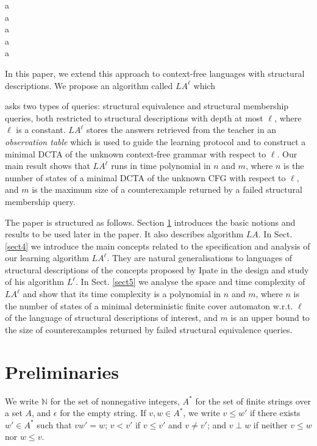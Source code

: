 \documentclass[preprint,12pt,english]{article}
\newcommand\comment[1]{}
\begin{document}
{a\\
a\\
a\\
a\\
a
}

In this paper, we extend this approach to context-free languages with structural descriptions. 
We propose an algorithm called $LA^\ell$ which 
\comment{is an adaptation of the learning algorithms $LA$ and $L^\ell$ in the following ways:
It} 
asks two types of queries: structural equivalence and structural membership queries, both restricted to structural descriptions with depth at most $\ell$, where $\ell$ is a constant.
$LA^\ell$ stores the answers retrieved from the teacher in an {\em observation table} which is used to guide the learning protocol and to construct a minimal DCTA of the unknown context-free grammar with respect to $\ell$.
Our main result shows that $LA^\ell$ runs in time  polynomial in $n$ and $m$, where $n$ is the number of states of a minimal DCTA of the unknown CFG with respect to $\ell$, and $m$ is the maximum size of a counterexample returned by a failed structural membership query. 

The paper is structured as follows. Section \ref{prelim} introduces the basic notions and results to be used later in the paper. It also describes algorithm $LA$. 
In Sect. \ref{sect4} we introduce the main concepts related to the specification and analysis of our learning algorithm $LA^\ell$. They are natural generalisations to languages of structural descriptions of the concepts proposed by Ipate \cite{Ipate:2012} in the design and study of his algorithm $L^\ell$. In Sect. \ref{sect5} we analyse the space and time complexity of $LA^\ell$ and show that its time complexity is a polynomial in $n$ and $m$, where $n$ is the number of states of a minimal deterministic finite cover automaton w.r.t. $\ell$ of the language of structural descriptions of interest, and $m$ is an upper bound to the size of counterexamples returned by failed structural equivalence queries. \section{Preliminaries}
\label{prelim}
We write $\mathbb{N}$ for the set of nonnegative integers, $A^*$ for the set of finite strings over a set $A$, and $\epsilon$ for the empty string. If $v,w\in A^*$, we write $v\leq w'$ if there exists $w'\in A^*$ such that $v w'=w$; $v<v'$ if $v\leq v'$ and $v\neq v'$; and $v\perp w$ if neither $v\leq w$ nor $w\leq v.$  
\end{document}
